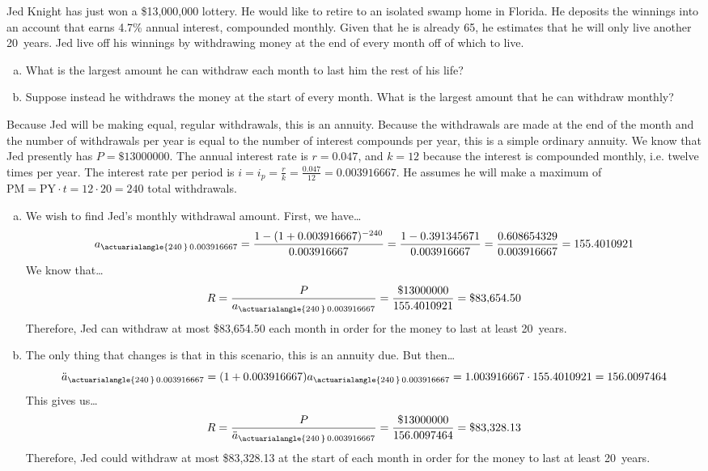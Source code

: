 \documentclass[11pt,letterpaper]{article}
\begin{document}
\newpage



 Jed Knight has just won a \$13,000,000 lottery. He would like to retire to an isolated swamp home in Florida. He deposits the winnings into an account that earns 4.7\% annual interest, compounded monthly. Given that he is already 65, he estimates that he will only live another 20~years. Jed live off his winnings by withdrawing money at the end of every month off of which to live.
	\begin{enumerate}[(a)]
	\item  What is the largest amount he can withdraw each month to last him the rest of his life?
	\item Suppose instead he withdraws the money at the start of every month. What is the largest amount that he can withdraw monthly? 
	\end{enumerate} \pspace

\sol Because Jed will be making equal, regular withdrawals, this is an annuity. Because the withdrawals are made at the end of the month and the number of withdrawals per year is equal to the number of interest compounds per year, this is a simple ordinary annuity. We know that Jed presently has $P= \$13000000$. The annual interest rate is $r= 0.047$, and $k= 12$ because the interest is compounded monthly, i.e. twelve times per year. The interest rate per period is $i= i_p= \frac{r}{k}= \frac{0.047}{12}= 0.003916667$. He assumes he will make a maximum of $\text{PM}= \text{PY} \cdot t= 12 \cdot 20= 240$ total withdrawals. 



\begin{enumerate}[(a)]
\item We wish to find Jed's monthly withdrawal amount. First, we have\dots
	\[
	a_{\actuarialangle{240\,}\, 0.003916667}= \dfrac{1 - (1 + 0.003916667)^{-240}}{0.003916667}= \dfrac{1 - 0.391345671}{0.003916667}= \dfrac{0.608654329}{0.003916667}= 155.4010921
	\]
We know that\dots
	\[
	R= \dfrac{P}{a_{\actuarialangle{240\,}\, 0.003916667}}= \dfrac{\$13000000}{155.4010921}= \$83,\!654.50
	\]
Therefore, Jed can withdraw at most \$83,654.50 each month in order for the money to last at least 20~years. \pspace

\item The only thing that changes is that in this scenario, this is an annuity due. But then\dots
	\[
	\ddot{a}_{\actuarialangle{240\,}\, 0.003916667}= (1 + 0.003916667) a_{\actuarialangle{240\,}\, 0.003916667}= 1.003916667 \cdot 155.4010921= 156.0097464
	\]
This gives us\dots
	\[
	R= \dfrac{P}{\ddot{a}_{\actuarialangle{240\,}\, 0.003916667}}= \dfrac{\$13000000}{156.0097464}= \$83,\!328.13
	\]
Therefore, Jed could withdraw at most \$83,328.13 at the start of each month in order for the money to last at least 20~years. 
\end{enumerate}
\end{document}
